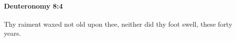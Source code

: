 
		\paragraph{Deuteronomy 8:4} %
			\label{DEUTERONOMY-8-4}

			Thy raiment waxed not old upon thee, neither did thy foot swell, these forty years.



